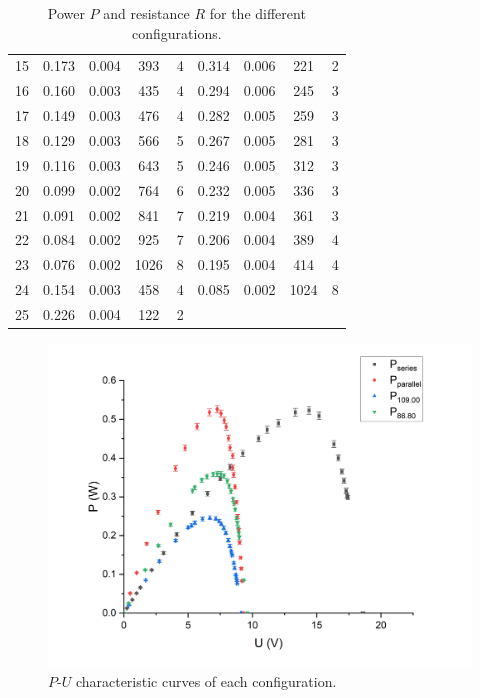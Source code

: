\documentclass{article}
\begin{document}
{\begin{table}[H]
\begin{tabular}{@{}c|cc|cc||cc|cc@{}}
15 & 0.173  & 0.004     & 393          & 4                & 0.314  & 0.006     & 221          & 2                \\
16 & 0.160  & 0.003     & 435          & 4                & 0.294  & 0.006     & 245          & 3                \\
17 & 0.149  & 0.003     & 476          & 4                & 0.282  & 0.005     & 259          & 3                \\
18 & 0.129  & 0.003     & 566          & 5                & 0.267  & 0.005     & 281          & 3                \\
19 & 0.116  & 0.003     & 643          & 5                & 0.246  & 0.005     & 312          & 3                \\
20 & 0.099  & 0.002     & 764          & 6                & 0.232  & 0.005     & 336          & 3                \\
21 & 0.091  & 0.002     & 841          & 7                & 0.219  & 0.004     & 361          & 3                \\
22 & 0.084  & 0.002     & 925          & 7                & 0.206  & 0.004     & 389          & 4                \\
23 & 0.076  & 0.002     & 1026         & 8                & 0.195  & 0.004     & 414          & 4                \\
24 & 0.154  & 0.003     & 458          & 4                & 0.085  & 0.002     & 1024         & 8                \\
25 & 0.226  & 0.004     & 122          & 2                &        &           &              &        \\ \bottomrule         
\end{tabular}

\caption{Power $P$ and resistance $R$ for the different configurations.}\label{tab.P&R}
\end{table}


\begin{figure}[H]
\centering
\includegraphics[scale=0.5]{P-U plot}\caption{$P$-$U$ characteristic curves of each configuration.}\label{fig.P-U}
\end{figure}

}
\end{document}
